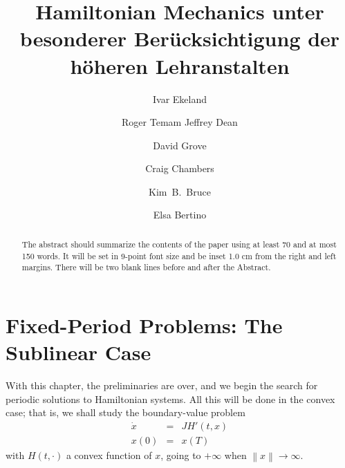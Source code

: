 \documentclass[lnbip]{svmultln}
\begin{document}
%
\mainmatter              %
%
\title{Hamiltonian Mechanics unter besonderer Ber\"ucksichtigung der
h\"oheren Lehranstalten}
%
%
\author{Ivar Ekeland \and Roger Temam
Jeffrey Dean \and David Grove \and Craig Chambers \and Kim~B.~Bruce \and
Elsa Bertino}
%
%
%

\maketitle              %

\begin{abstract}        %
The abstract should summarize the contents of the paper
using at least 70 and at most 150 words. It will be set in 9-point
font size and be inset 1.0 cm from the right and left margins.
There will be two blank lines before and after the Abstract.
\end{abstract}
%
\section{Fixed-Period Problems: The Sublinear Case}
%
With this chapter, the preliminaries are over, and we begin the search
for periodic solutions to Hamiltonian systems. All this will be done in
the convex case; that is, we shall study the boundary-value problem
\begin{eqnarray*}
  \dot{x}&=&JH' (t,x)\\
  x(0) &=& x(T)
\end{eqnarray*}
with $H(t,\cdot)$ a convex function of $x$, going to $+\infty$ when
$\left\|x\right\| \to \infty$.
\end{document}
